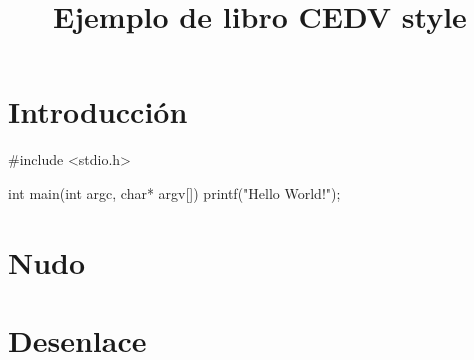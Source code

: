 \documentclass[a4paper, twoside]{book}
\title{Ejemplo de libro CEDV style}
\begin{document}
\maketitle

\chapter{Introducción}

\begin{listing}[language=C]
#include <stdio.h>

int main(int argc, char* argv[]) {
  printf("Hello World!");
}
\end{listing}

\chapter{Nudo}

\chapter{Desenlace}
\end{document}
